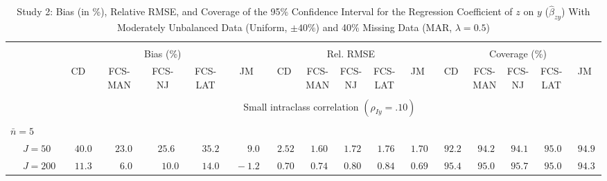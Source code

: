 \begin{sidewaystable}
\begin{threeparttable}
\setlength{\tabcolsep}{1.0pt}
\renewcommand{\arraystretch}{0.95}
\footnotesize
\caption{\small Study 2: Bias (in \%), Relative RMSE, and Coverage of the 95\% Confidence Interval for the Regression Coefficient of $z$ on $y$ ($\hat\beta_{zy}$) With Moderately Unbalanced Data (Uniform, $\pm 40\%$) and 40\% Missing Data (MAR, $\lambda=0.5$)}
\begin{tabular}{llccccccccccccccc}
\hline\\[-1.8ex]
& & \multicolumn{5}{c}{Bias (\%)} & \multicolumn{5}{c}{Rel. RMSE} & \multicolumn{5}{c}{Coverage (\%)} \\ \cmidrule(r){3-7}\cmidrule(r){8-12}\cmidrule(r){13-17}
 &  & CD & \makecell{FCS-\\MAN} & \makecell{FCS-\\NJ} & \makecell{FCS-\\LAT} & JM & CD & \makecell{FCS-\\MAN} & \makecell{FCS-\\NJ} & \makecell{FCS-\\LAT} & JM & CD & \makecell{FCS-\\MAN} & \makecell{FCS-\\NJ} & \makecell{FCS-\\LAT} & \multicolumn{1}{c}{JM} \\ 
[0.4ex]\hline\\[-1.8ex]
& & \multicolumn{15}{c}{Small intraclass correlation $(\rho_{Iy}=.10)$} \\[0.6ex]\hline\\[-1.8ex]
\multicolumn{4}{l}{$\bar{n}=5$} \\  & \nopagebreak $\;J=50$  & $\phantom{-}40.0\phantom{0}$ & $\phantom{-}23.0\phantom{0}$ & $\phantom{-}25.6\phantom{0}$ & $\phantom{-}35.2\phantom{0}$ & $\phantom{0}\phantom{-}9.0\phantom{0}$ & $\phantom{0}2.52\phantom{0}$ & $\phantom{0}1.60\phantom{0}$ & $\phantom{0}1.72\phantom{0}$ & $\phantom{0}1.76\phantom{0}$ & $\phantom{0}1.70\phantom{0}$ & $\phantom{0}92.2\phantom{0}$ & $\phantom{0}94.2\phantom{0}$ & $\phantom{0}94.1\phantom{0}$ & $\phantom{0}95.0\phantom{0}$ & $\phantom{0}94.9\phantom{0}$ \\
 & \nopagebreak $\;J=200$  & $\phantom{-}11.3\phantom{0}$ & $\phantom{0}\phantom{-}6.0\phantom{0}$ & $\phantom{0}\phantom{-}10.0\phantom{0}$ & $\phantom{-}14.0\phantom{0}$ & $\phantom{0}{-}1.2\phantom{0}$ & $\phantom{0}0.70\phantom{0}$ & $\phantom{0}0.74\phantom{0}$ & $\phantom{0}0.80\phantom{0}$ & $\phantom{0}0.84\phantom{0}$ & $\phantom{0}0.69\phantom{0}$ & $\phantom{0}95.4\phantom{0}$ & $\phantom{0}95.0\phantom{0}$ & $\phantom{0}95.7\phantom{0}$ & $\phantom{0}95.0\phantom{0}$ & $\phantom{0}94.3\phantom{0}$ \\

\end{tabular}
\end{threeparttable}
\end{sidewaystable}
